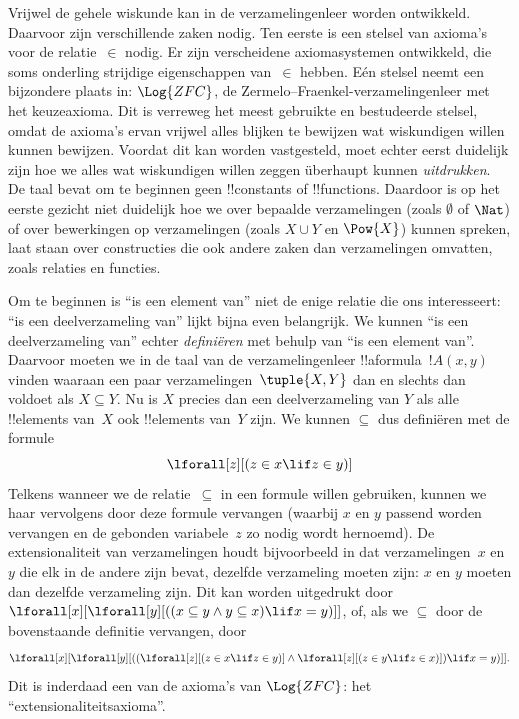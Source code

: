 \documentclass[../../../include/open-logic-section]{subfiles}
\begin{document}


Vrijwel de gehele wiskunde kan in de verzamelingenleer worden
ontwikkeld. Daarvoor zijn verschillende zaken nodig. Ten eerste is een
stelsel van axioma's voor de relatie~$\in$ nodig. Er zijn verscheidene
axiomasystemen ontwikkeld, die soms onderling strijdige eigenschappen
van~$\in$ hebben. Eén stelsel neemt een bijzondere plaats in:
$\Log{ZFC}$, de Zermelo--Fraenkel-verzamelingenleer met het keuzeaxioma.
Dit is verreweg het meest gebruikte en bestudeerde stelsel, omdat de
axioma's ervan vrijwel alles blijken te bewijzen wat wiskundigen willen
kunnen bewijzen. Voordat dit kan worden vastgesteld, moet echter eerst
duidelijk zijn hoe we alles wat wiskundigen willen zeggen überhaupt
kunnen \emph{uitdrukken}. De taal bevat om te beginnen geen
!!{constant}s of !!{function}s. Daardoor is op het eerste gezicht niet
duidelijk hoe we over bepaalde verzamelingen (zoals $\emptyset$ of
$\Nat$) of over bewerkingen op verzamelingen (zoals $X \cup Y$ en
$\Pow{X}$) kunnen spreken, laat staan over constructies die ook andere
zaken dan verzamelingen omvatten, zoals relaties en functies.

Om te beginnen is ``is een element van'' niet de enige relatie die ons
interesseert: ``is een deelverzameling van'' lijkt bijna even
belangrijk. We kunnen ``is een deelverzameling van'' echter
\emph{definiëren} met behulp van ``is een element van''. Daarvoor
moeten we in de taal van de verzamelingenleer !!a{formula}~$!A(x, y)$
vinden waaraan een paar verzamelingen~$\tuple{X, Y}$ dan en slechts dan
voldoet als $X \subseteq Y$. Nu is $X$ precies dan een deelverzameling
van $Y$ als alle !!{element}s van~$X$ ook !!{element}s van~$Y$ zijn.
We kunnen $\subseteq$ dus definiëren met de formule
\[
\lforall[z][(z \in x \lif z \in y)]
\]
Telkens wanneer we de relatie~$\subseteq$ in een formule willen
gebruiken, kunnen we haar vervolgens door deze formule vervangen
(waarbij $x$ en $y$ passend worden vervangen en de gebonden
variabele~$z$ zo nodig wordt hernoemd). De extensionaliteit van
verzamelingen houdt bijvoorbeeld in dat verzamelingen~$x$ en $y$ die
elk in de andere zijn bevat, dezelfde verzameling moeten zijn: $x$ en
$y$ moeten dan dezelfde verzameling zijn. Dit kan
worden uitgedrukt door $\lforall[x][\lforall[y][((x \subseteq y \land y
    \subseteq x) \lif x = y)]]$, of, als we $\subseteq$ door de
bovenstaande definitie vervangen, door
\[
\lforall[x][\lforall[y][((\lforall[z][(z \in x \lif z \in y)] \land
    \lforall[z][(z \in y \lif z \in x)]) \lif x = y)]].
\]
Dit is inderdaad een van de axioma's van $\Log{ZFC}$: het
``extensionaliteitsaxioma''.
\end{document}
